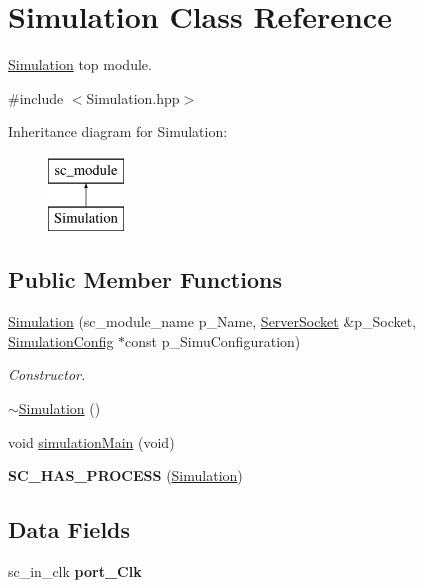 \hypertarget{classSimulation}{\section{Simulation Class Reference}
\label{classSimulation}
}


\hyperlink{classSimulation}{Simulation} top module.  




{\ttfamily \#include $<$Simulation.\-hpp$>$}

Inheritance diagram for Simulation\-:\begin{figure}[H]
\begin{center}
\leavevmode
\includegraphics[height=2.000000cm]{classSimulation}
\end{center}
\end{figure}
\subsection*{Public Member Functions}
\begin{DoxyCompactItemize}
\item 
\hyperlink{classSimulation_aa163d3b4d5be9400573bb651087130d3}{Simulation} (sc\-\_\-module\-\_\-name p\-\_\-\-Name, \hyperlink{classServerSocket}{Server\-Socket} \&p\-\_\-\-Socket, \hyperlink{classSimulationConfig}{Simulation\-Config} $\ast$const p\-\_\-\-Simu\-Configuration)
\begin{DoxyCompactList}\small\item\em Constructor. \end{DoxyCompactList}\item 
\hyperlink{classSimulation_a80fad3f57dfaf195a36f7bc49bc88279}{$\sim$\-Simulation} ()
\item 
void \hyperlink{classSimulation_a313c740e616b0165c7d36f6835e61c5a}{simulation\-Main} (void)
\item 
\hypertarget{classSimulation_ab947ad2db5f5fb5a875349b2957480bd}{{\bfseries S\-C\-\_\-\-H\-A\-S\-\_\-\-P\-R\-O\-C\-E\-S\-S} (\hyperlink{classSimulation}{Simulation})}\label{classSimulation_ab947ad2db5f5fb5a875349b2957480bd}

\end{DoxyCompactItemize}
\subsection*{Data Fields}
\begin{DoxyCompactItemize}
\item 
\hypertarget{classSimulation_aeab788f0684ab0b28b3843c2b3b439a1}{sc\-\_\-in\-\_\-clk {\bfseries port\-\_\-\-Clk}}\label{classSimulation_aeab788f0684ab0b28b3843c2b3b439a1}

\end{DoxyCompactItemize}


